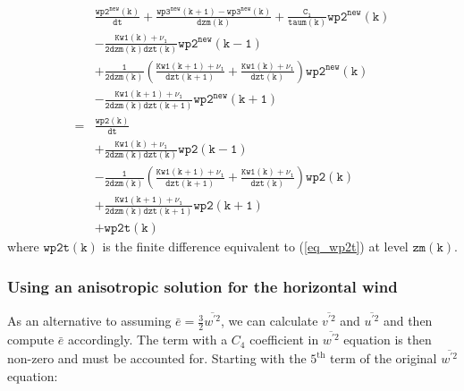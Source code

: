 \documentclass[11pt,fleqn]{article}
\begin{document}
\begin{equation}
\label{eq_wp2e}
\begin{split}
& \mathtt{
  \frac{wp2^{new}(k)}{dt}
+ \frac{wp3^{new}(k+1) - wp3^{new}(k)}{dzm(k)}
+ \frac{C_1}{taum(k)} wp2^{new}(k)
  } \\
& \mathtt{
  -\frac{Kw1(k)+\nu_1}{2 dzm(k)dzt(k)} wp2^{new}(k-1)
  } \\
& \mathtt{
  +\frac{1}{2 dzm(k)} \left(  \frac{Kw1(k+1)+\nu_1}{dzt(k+1)} 
                            + \frac{Kw1(k)+\nu_1}{dzt(k)} \right) wp2^{new}(k)
  } \\
& \mathtt{
  -\frac{Kw1(k+1)+\nu_1}{2 dzm(k)dzt(k+1)} wp2^{new}(k+1)
  } \\
=& \mathtt{
  \frac{wp2(k)}{dt}
  } \\
& \mathtt{
  +\frac{Kw1(k)+\nu_1}{2 dzm(k)dzt(k)} wp2(k-1)
  } \\
& \mathtt{
  -\frac{1}{2 dzm(k)} \left(  \frac{Kw1(k+1)+\nu_1}{dzt(k+1)} 
                            + \frac{Kw1(k)+\nu_1}{dzt(k)} \right) wp2(k)
  } \\
& \mathtt{
  +\frac{Kw1(k+1)+\nu_1}{2 dzm(k)dzt(k+1)} wp2(k+1)
  } \\
& \mathtt{
  + wp2t(k)
  }
\end{split}
\end{equation}
%
where $\mathtt{wp2t(k)}$ is the finite difference equivalent to (\ref{eq_wp2t}) 
at level $\mathtt{zm(k)}$.

\subsubsection{Using an anisotropic solution for the horizontal wind} 

As an alternative to assuming $\bar{e} = \frac{3}{2} \overline{w^{'2}}$, we
can calculate $\overline{v^{'2}}$ and $\overline{u^{'2}}$ and then 
compute $\bar{e}$ accordingly.  The term with a $C_4$ coefficient in 
$\overline{w^{'2}}$ equation is then non-zero and must be accounted for.  
Starting with 
the $5^{\mathrm{th}}$ term of the original $\overline{w^{'2}}$ equation:
\end{document}

